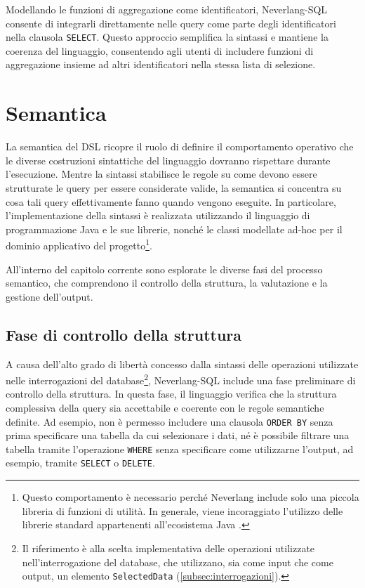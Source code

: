 \documentclass[12pt,a4paper,openright,twoside]{book}
\begin{document}
Modellando le funzioni di aggregazione come identificatori, Neverlang-SQL consente di integrarli direttamente nelle query come 
parte degli identificatori nella clausola \texttt{SELECT}. Questo approccio semplifica la sintassi e mantiene la coerenza del 
linguaggio, consentendo agli utenti di includere funzioni di aggregazione insieme ad altri identificatori nella stessa lista di 
selezione.

\section{Semantica}
La semantica del DSL ricopre il ruolo di definire il comportamento operativo che le diverse costruzioni sintattiche del linguaggio dovranno 
rispettare durante l’esecuzione. Mentre la sintassi stabilisce le regole su come devono essere strutturate le query per essere considerate 
valide, la semantica si concentra su cosa tali query effettivamente fanno quando vengono eseguite. In particolare, l’implementazione della 
sintassi è realizzata utilizzando il linguaggio di programmazione Java e le sue librerie, nonché le classi modellate ad-hoc per il dominio 
applicativo del progetto\footnote{Questo comportamento è necessario perché Neverlang include solo una piccola libreria di funzioni di 
utilità. In generale, viene incoraggiato l’utilizzo delle librerie standard appartenenti all’ecosistema Java \cite{Vacchi2015}.}.

All’interno del capitolo corrente sono esplorate le diverse fasi del processo semantico, che comprendono il controllo della struttura, la 
valutazione e la gestione dell’output.

\subsection{Fase di controllo della struttura}
A causa dell’alto grado di libertà concesso dalla sintassi delle operazioni utilizzate nelle interrogazioni del database\footnote{Il 
riferimento è alla scelta implementativa delle operazioni utilizzate nell’interrogazione del database, che utilizzano, sia come input che 
come output, un elemento \texttt{SelectedData} (\cref{subsec:interrogazioni}).}, Neverlang-SQL include una fase preliminare di 
controllo della struttura. In questa fase, il linguaggio verifica che la struttura complessiva della query sia accettabile e coerente con le 
regole semantiche definite. Ad esempio, non è permesso includere una clausola \texttt{ORDER BY} senza prima specificare una tabella da cui 
selezionare i dati, né è possibile filtrare una tabella tramite l’operazione \texttt{WHERE} senza specificare come utilizzarne l’output, ad 
esempio, tramite \texttt{SELECT} o \texttt{DELETE}.
\end{document}
